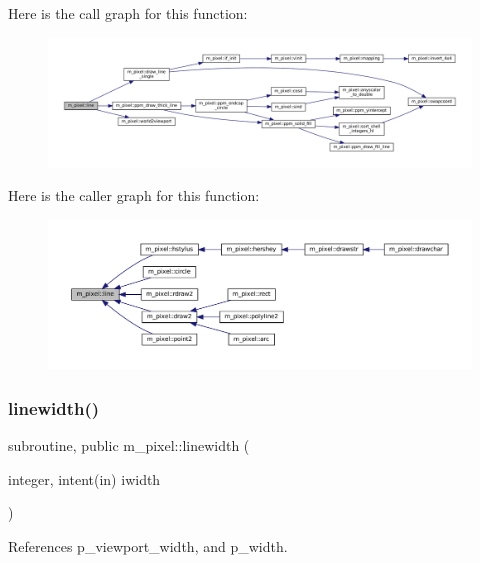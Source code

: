 Here is the call graph for this function\+:
\nopagebreak
\begin{figure}[H]
\begin{center}
\leavevmode
\includegraphics[width=350pt]{namespacem__pixel_a491951b89e60d0d40d67f22d987da894_cgraph}
\end{center}
\end{figure}
Here is the caller graph for this function\+:
\nopagebreak
\begin{figure}[H]
\begin{center}
\leavevmode
\includegraphics[width=350pt]{namespacem__pixel_a491951b89e60d0d40d67f22d987da894_icgraph}
\end{center}
\end{figure}
\mbox{\label{namespacem__pixel_a16379e283aaa99e2e0ba1eb26e93452d}} 
\subsubsection{\texorpdfstring{linewidth()}{linewidth()}}
{\footnotesize\ttfamily subroutine, public m\+\_\+pixel\+::linewidth (\begin{DoxyParamCaption}\item[{integer, intent(in)}]{iwidth }\end{DoxyParamCaption})}



References p\+\_\+viewport\+\_\+width, and p\+\_\+width.

\mbox{\label{namespacem__pixel_a7b4934756a8325a19fee6653c4cbf6af}} 
